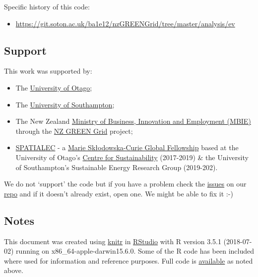 \documentclass[]{article}
\providecommand{\tightlist}{%
  \setlength{\itemsep}{0pt}\setlength{\parskip}{0pt}}
\begin{document}
Specific history of this code:

\begin{itemize}
\tightlist
\item
  \url{https://git.soton.ac.uk/ba1e12/nzGREENGrid/tree/master/analysis/ev}
\end{itemize}

\subsection{Support}\label{support}

This work was supported by:

\begin{itemize}
\tightlist
\item
  The \href{https://www.otago.ac.nz/}{University of Otago};
\item
  The \href{https://www.southampton.ac.uk/}{University of Southampton};
\item
  The New Zealand \href{http://www.mbie.govt.nz/}{Ministry of Business,
  Innovation and Employment (MBIE)} through the
  \href{https://www.otago.ac.nz/centre-sustainability/research/energy/otago050285.html}{NZ
  GREEN Grid} project;
\item
  \href{http://www.energy.soton.ac.uk/tag/spatialec/}{SPATIALEC} - a
  \href{http://ec.europa.eu/research/mariecurieactions/about-msca/actions/if/index_en.htm}{Marie
  Skłodowska-Curie Global Fellowship} based at the University of Otago's
  \href{http://www.otago.ac.nz/centre-sustainability/staff/otago673896.html}{Centre
  for Sustainability} (2017-2019) \& the University of Southampton's
  Sustainable Energy Research Group (2019-202).
\end{itemize}

We do not `support' the code but if you have a problem check the
\href{https://git.soton.ac.uk/ba1e12/nzGREENGrid/issues}{issues} on our
\href{https://git.soton.ac.uk/ba1e12/nzGREENGrid}{repo} and if it
doesn't already exist, open one. We might be able to fix it :-)

\subsection{Notes}\label{notes}

This document was created using
\href{https://cran.r-project.org/package=knitr}{knitr} in
\href{http://www.rstudio.com}{RStudio} with R version 3.5.1 (2018-07-02)
running on x86\_64-apple-darwin15.6.0. Some of the R code has been
included where used for information and reference purposes. Full code is
\href{https://github.com/CfSOtago/GREENGrid/tree/master/analysis/ev}{available}
as noted above.
\end{document}
